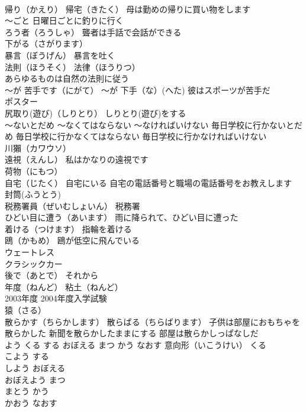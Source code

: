 \documentclass[8pt]{extreport}
\begin{document}
\begin{CJK}{UTF8}{min}
\\	帰り（かえり） 帰宅（きたく） 母は勤めの帰りに買い物をします
\\	～ごと 日曜日ごとに釣りに行く
\\	ろう者（ろうしゃ） 聾者は手話で会話ができる
\\	下がる（さがります）
\\	暴言（ぼうげん） 暴言を吐く
\\	法則（ほうそく） 法律（ほうりつ）
\\	あらゆるものは自然の法則に従う
\\	～が 苦手です（にがて） ～が 下手（な）(へた) 彼はスポーツが苦手だ
\\	ポスター
\\	尻取り(遊び)（しりとり） しりとり(遊び)をする
\\	～ないとだめ ～なくてはならない ～なければいけない 毎日学校に行かないとだめ 毎日学校に行かなくてはならない 毎日学校に行かなければいけない
\\	川獺（カワウソ）
\\	遠視（えんし） 私はかなりの遠視です
\\	荷物（にもつ）
\\	自宅（じたく） 自宅にいる 自宅の電話番号と職場の電話番号をお教えします
\\	封筒(ふうとう)
\\	税務署員（ぜいむしょいん） 税務署
\\	ひどい目に遭う（あいます） 雨に降られて、ひどい目に遭った
\\	着ける（つけます） 指輪を着ける
\\	鴎（かもめ） 鴎が低空に飛んでいる
\\	ウェートレス
\\	クラシックカー
\\	後で（あとで） それから
\\	年度（ねんど） 粘土（ねんど）
\\	2003年度 2004年度入学試験
\\	猿（さる）
\\	散らかす（ちらかします） 散らばる（ちらばります） 子供は部屋におもちゃを散らかした 新聞を散らかしたままにする 部屋は散らかしっぱなしだ
\\	よう くる する おぼえる まつ かう なおす	意向形（いこうけい） くる 
\\	こよう する 
\\	しよう おぼえる 
\\	おぼえよう まつ 
\\	まとう かう 
\\	かおう なおす 

\end{CJK}
\end{document}
